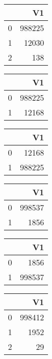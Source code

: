 \bigskip\bigskip
\centering
\begin{tabular}{rr}
  \hline
 & V1 \\ 
  \hline
0 & 988225 \\ 
  1 & 12030 \\ 
  2 & 138 \\ 
   \hline
\end{tabular}

\bigskip\bigskip
\centering
\begin{tabular}{rr}
  \hline
 & V1 \\ 
  \hline
0 & 988225 \\ 
  1 & 12168 \\ 
   \hline
\end{tabular}

\bigskip\bigskip
\centering
\begin{tabular}{rr}
  \hline
 & V1 \\ 
  \hline
0 & 12168 \\ 
  1 & 988225 \\ 
   \hline
\end{tabular}

\bigskip\bigskip
\centering
\begin{tabular}{rr}
  \hline
 & V1 \\ 
  \hline
0 & 998537 \\ 
  1 & 1856 \\ 
   \hline
\end{tabular}

\bigskip\bigskip
\centering
\begin{tabular}{rr}
  \hline
 & V1 \\ 
  \hline
0 & 1856 \\ 
  1 & 998537 \\ 
   \hline
\end{tabular}

\bigskip\bigskip
\centering
\begin{tabular}{rr}
  \hline
 & V1 \\ 
  \hline
0 & 998412 \\ 
  1 & 1952 \\ 
  2 &  29 \\ 
   \hline
\end{tabular}

